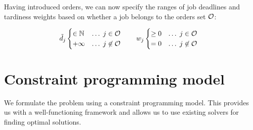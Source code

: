 Having introduced orders, we can now specify the ranges of job deadlines and tardiness weights
based on whether a job belongs to the orders set $\mathcal{O}$:

$$
\tilde{d}_{j} \begin{cases}
    \in \mathbb{N}    &\dots\;   j     \in \mathcal{O} \\
    +\infty   &\dots\;   j \not\in \mathcal{O}
\end{cases}
\qquad
w_{j} \begin{cases}
    \geq 0   &\dots\;   j     \in \mathcal{O} \\
       = 0   &\dots\;   j \not\in \mathcal{O}
\end{cases}
$$

\section{Constraint programming model} \label{sec:constraint-programming-model}

We formulate the problem using a constraint programming model.
This provides us with a well-functioning framework
and allows us to use existing solvers for finding optimal solutions.

